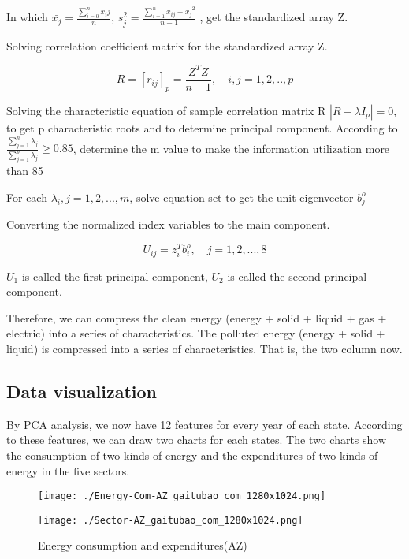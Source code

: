 \documentclass[a4paper]{article}
\begin{document}
In which $\bar{x_j}=\frac{\sum_{i=0}^{n}{x_ij}}{n}$, $s^{2}_{j}=\frac{\sum_{i=1}^{n}{x_{ij}-\bar{x_j}}^{2}}{n-1}$ , get the standardized array Z.

Solving correlation coefficient matrix for the standardized array Z.

\[R = [r_{ij}]_{p} = \frac{Z^{T}Z}{n-1},\quad i,j=1,2,..,p\]

Solving the characteristic equation of sample correlation matrix R $|R - \lambda I_p| = 0$, to get p characteristic roots and to determine principal component.
According to $\frac{\sum_{j=1}^{n}{\lambda_{j}}}{\sum_{j=1}^{p}{\lambda_{j}}} \geq 0.85$, determine the m value to make the information utilization more than 85%

For each $\lambda_{i}, j = 1,2,...,m$, solve equation set to get the unit eigenvector $b_{j}^{o}$

Converting the normalized index variables to the main component.

\[U_{ij} = z_{i}^{T}b_{i}^{o},\quad j = 1,2,...,8\]

$U_1$ is called the first principal component, $U_2$ is called the second principal component. 

Therefore, we can compress the clean energy (energy + solid + liquid + gas + electric) into a series of characteristics. The polluted energy (energy + solid + liquid) is compressed into a series of characteristics. That is, the two column now.


\subsection{Data visualization}

By PCA analysis, we now have 12 features for every year of each state. According to these features, we can draw two charts for each states. The two charts show the consumption of two kinds of energy and the expenditures of two kinds of energy in the five sectors.

\begin{figure}[H]
\begin{minipage}[t]{0.5\linewidth}
\centering
\texttt{[image: ./Energy-Com-AZ\_gaitubao\_com\_1280x1024.png]}
\label{fig:side:a}
\end{minipage}%
\begin{minipage}[t]{0.5\linewidth}
\centering
\texttt{[image: ./Sector-AZ\_gaitubao\_com\_1280x1024.png]}
\label{fig:side:b}
\end{minipage}
\caption{Energy consumption and expenditures(AZ)}
\end{figure}
\end{document}
